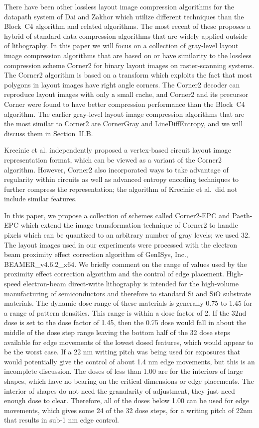 \documentclass{article}
\begin{document}
There have been other lossless layout image compression algorithms
for the datapath system of Dai and Zakhor which utilize different techniques
than the Block~C4 algorithm and related algorithms.  
The most recent of these proposes a hybrid of standard data compression
algorithms that are widely applied outside of lithography.
In this paper we will focus on a collection of gray-level layout image
compression algorithms that are based on or have similarity to the lossless
compression scheme Corner2 for binary layout images on 
raster-scanning systems.  The Corner2 algorithm is based on a transform which 
exploits the fact that most polygons in layout images have right angle 
corners. The Corner2 decoder can reproduce layout images with only a small 
cache, and Corner2 and its precursor Corner were found to have better 
compression performance than the Block~C4 algorithm.  The earlier gray-level
layout image compression algorithms that are the most similar to Corner2
are CornerGray and LineDiffEntropy, and we will discuss them
in Section~II.B.

Krecinic et al. independently proposed a vertex-based circuit layout
image representation format, which can be viewed as a variant of the Corner2
algorithm.  However, Corner2 also incorporated ways to take advantage of
regularity within circuits as well as advanced entropy encoding techniques
to further compress the representation;  the algorithm of Krecinic et al.~did 
not include similar features.

In this paper, we propose a collection of schemes called Corner2-EPC 
and Paeth-EPC which
extend the image transformation technique of Corner2 to handle pixels which
can be quantized to an arbitrary number of gray levels; we used 32.
The layout images used in our experiments were processed with the electron 
beam proximity effect correction algorithm of GenISys, Inc.,
{\small BEAMER}\_v4.6.2\_x64.  We briefly comment on the range of values
used by the proximity effect correction algorithm and the control of edge
placement.  High-speed electron-beam direct-write lithography  is intended 
for the high-volume manufacturing of semiconductors and therefore to standard 
Si and SiO substrate materials.  The dynamic dose range of these materials 
is generally 0.75 to 1.45 for a range of pattern densities.  This range is 
within a dose factor of 2.  If the 32nd dose is set to the dose factor of 
1.45, then the 0.75 dose would fall in about the middle of the dose step 
range leaving the bottom half of the 32 dose steps available for edge 
movements of the lowest dosed features, which would appear to be the worst 
case.  If a 22 nm writing pitch was being used for exposures that would 
potentially give the control of about 1.4 nm edge movements, but this is an
incomplete discussion.  The doses of less than 1.00 are for the interiors of 
large shapes, which have no bearing on the critical dimensions or edge
placements.  The interior of shapes do not need the granularity of adjustment,
they just need enough dose to clear.  Therefore, all of the doses below 1.00 
can be used for edge movements, which gives some 24 of the 32 dose steps, for 
a writing pitch of 22nm that results in sub-1 nm edge control.
\end{document}
